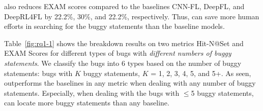 
{\tool} also reduces EXAM scores compared to the baselines CNN-FL,
DeepFL, and DeepRL4FL by 22.2\%, 30\%, and 22.2\%, respectively. Thus,
{\tool} can save more human efforts in searching for the buggy
statements than the baseline models.



Table~\ref{fig:rq1-1} shows the breakdown results on two metrics
Hit-N@Set and EXAM Scores for different types of bugs with {\em
different numbers of buggy statements}.
%
We classify the bugs into 6 types based on the number of buggy
statements: bugs with $K$ buggy statements, $K$ = 1, 2, 3, 4, 5, and
5+.
%
As seen, {\tool} outperforms the baselines in any metric
when dealing with any number of buggy statements. Especially, when
dealing with the bugs with $\leq$5 buggy statements, {\tool} can locate
more buggy statements than any baseline.

